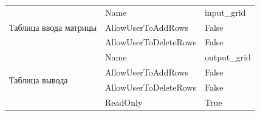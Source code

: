 \begin{table}[H]
\begin{tabular}{|l|l|l|}
\multirow{3}{*}{Таблица ввода матрицы}                                           & Name                                                                           & input\_grid                                                                   \\ \cline{2-3} 
                                                                                 & AllowUserToAddRows                                                             & False                                                                         \\ \cline{2-3} 
                                                                                 & AllowUserToDeleteRows                                                          & False                                                                         \\ \hline
\multirow{4}{*}{Таблица вывода}                                                  & Name                                                                           & output\_grid                                                                  \\ \cline{2-3} 
                                                                                 & AllowUserToAddRows                                                             & False                                                                         \\ \cline{2-3} 
                                                                                 & AllowUserToDeleteRows                                                          & False                                                                         \\ \cline{2-3} 
                                                                                 & ReadOnly                                                                       & True                                                                          \\ \hline
\end{tabular}
\label{task5_attributes}
\end{table}


